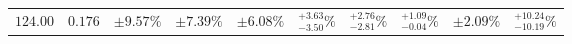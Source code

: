 \begin{table}[ht!]
{{\begin{tabular}{| cc | ccc | cccc | c |}
$124.00$ & $0.176$ & $\pm9.57\%$ & {\color{black!55}$\pm 7.39\%$} & {\color{black!55}$\pm 6.08\%$} & $^{+3.63}_{-3.50}\%$ & {\color{black!55}$^{+2.76}_{-2.81}\%$} & {\color{black!55}$^{+1.09}_{-0.04}\%$} & {\color{black!55}$\pm 2.09\%$} & $^{+10.24}_{-10.19}\%$  \\

\end{tabular}}}
\end{table}
